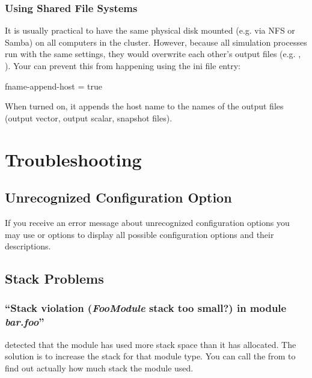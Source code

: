 \subsubsection{Using Shared File Systems}
\label{sec:run-sim:using-shared-filesystems}

It is usually practical to have the same physical disk mounted (e.g. via NFS or Samba)
on all computers in the cluster. However, because all {\opp} simulation
processes run with the same settings, they would overwrite each other's
output files (e.g. , ).
Your can prevent this from happening using the
 ini file entry:

\begin{inifile}
[General]
fname-append-host = true
\end{inifile}

When turned on, it appends the host name to the names of the output
files (output vector, output scalar, snapshot files).



\section{Troubleshooting}

\subsection{Unrecognized Configuration Option}

If you receive an error message about unrecognized configuration
options you may use  or  options
to display all possible configuration options and their descriptions.

\subsection{Stack Problems}

\subsubsection{``Stack violation (\textit{FooModule} stack too small?) in module \textit{bar.foo}''}

{\opp} detected that the module has used more stack space than it has
allocated. The solution is to increase the stack for that module type.
You can call the  from  to find out
actually how much stack the module used.


